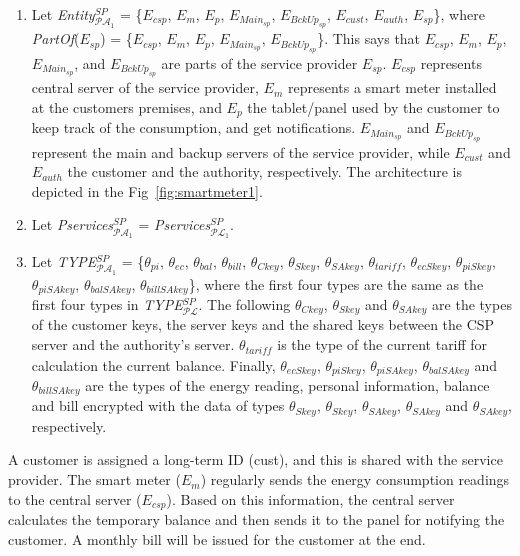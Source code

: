 \documentclass[a4paper]{article}
\begin{document}
\begin{enumerate}
\item Let \textit{Entity}$^{SP}_{\mathcal{P}\mathcal{A}_1}$ = \{$E_{csp}$, $E_{m}$, $E_{p}$, $E_{\textit{Main}_{sp}}$, $E_{\textit{BckUp}_{sp}}$, $E_{cust}$, $E_{auth}$, $E_{sp}$\}, where 
 \textit{PartOf}($E_{sp}$) = \{$E_{csp}$, $E_{m}$, $E_{p}$, $E_{\textit{Main}_{sp}}$, $E_{\textit{BckUp}_{sp}}$\}. This says that  $E_{csp}$, $E_{m}$, $E_{p}$, $E_{\textit{Main}_{sp}}$, and $E_{\textit{BckUp}_{sp}}$ are parts of the service provider $E_{sp}$. $E_{csp}$ represents central server of the service provider, $E_{m}$ represents a smart meter installed at the customers premises, and $E_{p}$ the tablet/panel used by the customer to keep track of the consumption, and get notifications. $E_{\textit{Main}_{sp}}$ and  $E_{\textit{BckUp}_{sp}}$ represent the main and backup servers of the service provider, while $E_{cust}$ and $E_{auth}$ the customer and the authority, respectively. The architecture is depicted in the Fig~\ref{fig:smartmeter1}.
 
\item Let \textit{Pservices}$^{SP}_{\mathcal{P}\mathcal{A}_1}$ = \textit{Pservices}$^{SP}_{\mathcal{P}\mathcal{L}_1}$.

\item Let  \textit{TYPE}$^{SP}_{\mathcal{P}\mathcal{A}_1}$ = \{$\theta_{pi}$, $\theta_{ec}$, $\theta_{bal}$, $\theta_{bill}$, $\theta_{Ckey}$, $\theta_{Skey}$, $\theta_{SAkey}$, $\theta_{\textit{tariff}}$, $\theta_{ecSkey}$, $\theta_{piSkey}$,  $\theta_{piSAkey}$, $\theta_{balSAkey}$, $\theta_{billSAkey}$\}, where the first four types are the same as the first four types in \textit{ TYPE}$^{SP}_{\mathcal{P}\mathcal{L}}$. The following  $\theta_{Ckey}$, $\theta_{Skey}$ and $\theta_{SAkey}$ are the types of the customer keys, the server keys and the shared keys between the CSP server and the authority's server. $\theta_{\textit{tariff}}$ is the type of the current tariff for calculation the current balance. Finally, $\theta_{ecSkey}$, $\theta_{piSkey}$,  $\theta_{piSAkey}$, $\theta_{balSAkey}$ and $\theta_{billSAkey}$ are the types of the energy reading, personal information, balance and bill encrypted with the data of types $\theta_{Skey}$, $\theta_{Skey}$, $\theta_{SAkey}$, $\theta_{SAkey}$ and $\theta_{SAkey}$, respectively.
\end{enumerate}


A customer is assigned a long-term ID (cust), and this is shared with the service provider. The smart meter ($E_{m}$) regularly sends the energy consumption readings to the central server ($E_{csp}$). Based on this information, the central server calculates the temporary balance and then sends it to the panel for notifying the customer.  A monthly bill will be issued for the customer at the end.      
\end{document}
